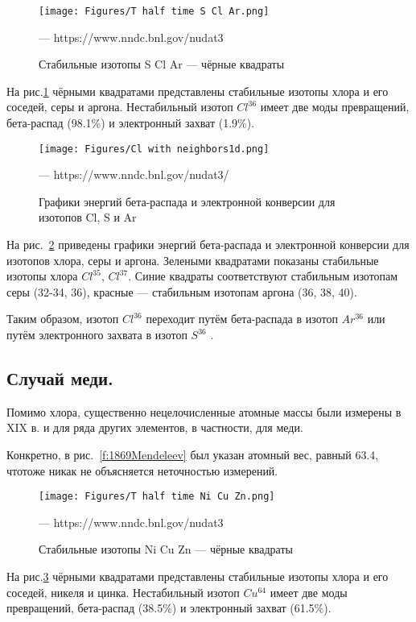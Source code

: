\documentclass[a5paper,openany]{book}
\begin{document}
\begin{figure}[ht] 
	\centering\small
	\unitlength=1mm
	\texttt{[image: Figures/T half time S Cl Ar.png]} 
	\caption{Стабильные изотопы S Cl Ar --- чёрные квадраты} --- https://www.nndc.bnl.gov/nudat3 
	\label{f:T half time S Cl Ar}
\end{figure}

На рис.\ref{f:T half time S Cl Ar} чёрными квадратами представлены стабильные изотопы хлора и его соседей, серы и аргона.
Нестабильный изотоп $Cl^{36}$ имеет две моды превращений, бета-распад (98.1\%) и электронный захват (1.9\%).


\begin{figure}[ht] 
	\centering\small
	\unitlength=1mm
	\texttt{[image: Figures/Cl with neighbors1d.png]} 
	\caption{Графики энергий бета-распада и электронной конверсии для изотопов Cl, S  и Ar} --- https://www.nndc.bnl.gov/nudat3/
	\label{f:Cl with neighbors1d}
\end{figure}

На рис.~\ref{f:Cl with neighbors1d} приведены графики энергий бета-распада и электронной конверсии для изотопов хлора, серы и аргона. Зелеными квадратами показаны стабильные изотопы хлора $Cl^{35}$, $Cl^{37}$. Синие квадраты соответствуют стабильным изотопам серы (32-34, 36), красные --- стабильным  изотопам аргона  (36, 38, 40).

Таким образом, изотоп $Cl^{36}$ переходит путём бета-распада в изотоп  $Ar^{36}$ или путём электронного захвата в изотоп  $S^{36}$ .

\subsection{Случай меди.} \label{Сu3537}

Помимо хлора, существенно нецелочисленные атомные массы были измерены в XIX в. и для ряда других элементов, в частности, для меди.

Конкретно, в \cite{Mendeleev1869}
рис.~\ref{f:1869Mendeleev}
был указан атомный вес, равный 63.4, чтотоже  никак  не объясняется неточностью измерений.

\begin{figure}[ht] 
	\centering\small
	\unitlength=1mm
	\texttt{[image: Figures/T half time Ni Cu Zn.png]} 
	\caption{Стабильные изотопы Ni Cu Zn --- чёрные квадраты} --- https://www.nndc.bnl.gov/nudat3 
	\label{f:T half time  Ni Cu Zn}
\end{figure}

На рис.\ref{f:T half time  Ni Cu Zn} чёрными квадратами представлены стабильные изотопы хлора и его соседей, никеля и цинка.
Нестабильный изотоп $Cu^{64}$ имеет две моды превращений, бета-распад (38.5\%) и электронный захват (61.5\%).
\end{document}

